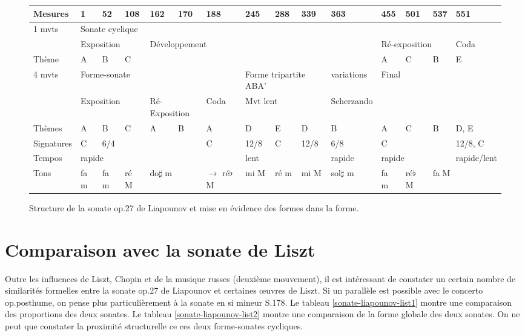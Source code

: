 \begin{figure}[!p]
  \begin{bigcenter}
    \vspace{-1cm}
     {
\begin{tabular}{|l|l|l|l|l|l|l|l|l|l|l|l|l|l|l|}
 \hline
   Mesures & 1 & 52 & 108 & 162 & 170 & 188 & 245 & 288 & 339 & 363 & 455 & 501 & 537 & 551 \\
 \hline
 \hline
   1 mvts & \multicolumn{14}{|l|}{Sonate cyclique}\\
 \hline
          & \multicolumn{3}{|l|}{Exposition} & \multicolumn{7}{l|}{Développement} & \multicolumn{3}{l|}{Ré-exposition} & Coda\\
 \hline
   Thème & A & B & C & \multicolumn{7}{l|}{} & A & C & B & E\\
 \hline
 \hline
   4 mvts & \multicolumn{6}{|l|}{Forme-sonate} & \multicolumn{3}{|l|}{Forme tripartite ABA'} & variations & \multicolumn{4}{|l|}{Final}\\
 \hline
          & \multicolumn{3}{|l|}{Exposition} & \multicolumn{2}{l|}{Ré-Exposition} & Coda & \multicolumn{3}{l|}{Mvt lent} & Scherzando & \multicolumn{4}{l|}{}\\
 \hline
  Thèmes & A & B & C & A & B & A & D & E & D & B & A & C & B & D, E\\
 \hline
 \hline
  Signatures & C & \multicolumn{4}{|l|}{6/4} & C & 12/8 & C & 12/8 & 6/8 & \multicolumn{3}{|l|}{C} & 12/8, C\\
 \hline
  Tempos & \multicolumn{6}{|l|}{rapide} & \multicolumn{3}{|l|}{lent} & rapide & \multicolumn{3}{|l|}{rapide} & rapide/lent\\
 \hline
  Tons & fa m & fa m & ré M & \multicolumn{2}{|l|}{do$\sharp$ m} & $\to$ ré$\flat$ M & mi M & ré m & mi M & sol$\sharp$ m & fa m & ré$\flat$ M & \multicolumn{2}{|l|}{fa M}\\
 \hline
\end{tabular}
    }
  \end{bigcenter}
  \caption{\label{structure}Structure de la sonate op.27 de Liapounov et mise en évidence des formes dans la forme.}
\end{figure}

\section{Comparaison avec la sonate de Liszt}

Outre les influences de Liszt, Chopin et de la musique russes (deuxième mouvement), il est intéressant de constater un certain nombre de similarités formelles entre la sonate op.27 de Liapounov et certaines œuvres de Liszt. Si un parallèle est possible avec le concerto op.posthume, on pense plus particulièrement à la sonate en si mineur S.178. Le tableau \ref{sonate-liapounov-list1} montre une comparaison des proportions des deux sonates. Le tableau \ref{sonate-liapounov-list2} montre une comparaison de la forme globale des deux sonates. On ne peut que constater la proximité structurelle ce ces deux forme-sonates cycliques.

